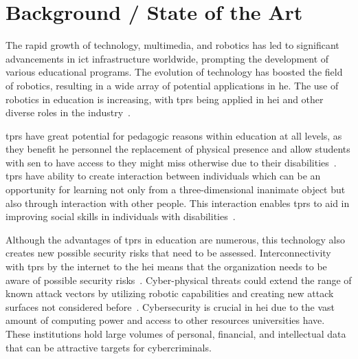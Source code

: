 
\newpage


\section{Background / State of the Art}

The rapid growth of technology, multimedia, and robotics has led to significant advancements in \ac{ict} infrastructure worldwide, prompting
the development of various educational programs. The evolution of technology has boosted the field of robotics, resulting in a wide array
of potential applications in \ac{he}. The use of robotics in education is increasing,
with \ac{tprs} being applied in \ac{hei} and other diverse roles in the industry~\cite[]{telepresence_robots_in_classroom_2019,higher_edu_perception_on_tprs_2022}.

\ac{tprs} have great potential for pedagogic reasons within education at all levels, as they benefit \ac{he} personnel the replacement of
physical
presence and allow students with \ac{sen} to have access to  they might miss otherwise due to their disabilities~\cite[546]{
  telepresence_robots_in_classroom_2019}.
\ac{tprs} have ability to create interaction between individuals which can be an opportunity for learning not only from a three-dimensional
inanimate
object but also through interaction with other people. This interaction enables \ac{tprs} to aid in improving social
skills in individuals with disabilities~\cite[541]{telepresence_robots_in_classroom_2019}.

Although the advantages of \ac{tprs} in education are numerous, this technology also creates new possible security risks that need to be
assessed. Interconnectivity with \ac{tprs} by the internet to the \ac{hei} means that the organization needs to be aware of possible
security risks~\cite[120]{robotics_cyber_security_2022}. Cyber-physical threats could extend the range of known attack vectors by
utilizing robotic capabilities and creating new attack surfaces not considered before~\cite[18-19]{analyzing_cyber_physical_threats_2018}.
Cybersecurity
is crucial in \ac{hei} due
to the vast amount
of computing power and access to other resources
universities
have. These institutions hold large volumes of personal, financial, and intellectual data that can be attractive targets for cybercriminals.

